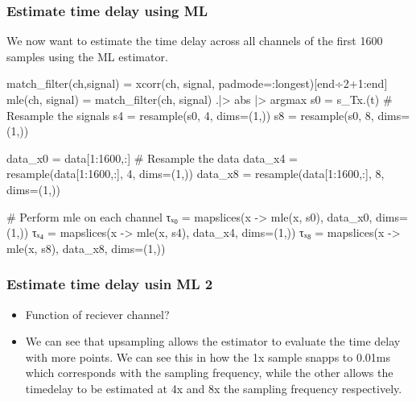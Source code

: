 \documentclass[compress]{beamer}
\begin{document}
\begin{frame}[fragile] %
    \frametitle{Estimate time delay using ML}
    We now want to estimate the time delay across all channels of the first 1600
    samples using the ML estimator. 
    \begin{jllisting}[gobble=8]
        match_filter(ch,signal) = xcorr(ch, signal, padmode=:longest)[end÷2+1:end] 
        mle(ch, signal) = match_filter(ch, signal) .|> abs |> argmax
        s0 = s_Tx.(t)
        # Resample the signals
        s4 = resample(s0, 4, dims=(1,))
        s8 = resample(s0, 8, dims=(1,))

        data_x0 = data[1:1600,:]
        # Resample the data
        data_x4 = resample(data[1:1600,:], 4, dims=(1,))
        data_x8 = resample(data[1:1600,:], 8, dims=(1,))

        # Perform mle on each channel 
        τₓ₀ = mapslices(x -> mle(x, s0), data_x0, dims=(1,))
        τₓ₄ = mapslices(x -> mle(x, s4), data_x4, dims=(1,))
        τₓ₈ = mapslices(x -> mle(x, s8), data_x8, dims=(1,))
    \end{jllisting}
\end{frame}

\begin{frame} %
    \frametitle{Estimate time delay usin ML 2}
    \begin{figure}
        
    \end{figure}
    \begin{itemize}
        \item Function of reciever channel?
        \item We can see that upsampling allows the estimator to evaluate the
            time delay with more points. We can see this in how the 1x sample
            snapps to 0.01ms which corresponds with the sampling frequency,
            while the other allows the timedelay to be estimated at 4x and 8x
            the sampling frequency respectively.
    \end{itemize}
\end{frame} %
\end{document}
